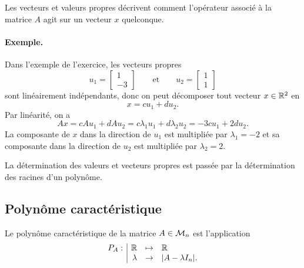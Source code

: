 \remark Les vecteurs et valeurs propres décrivent comment l'opérateur associé à la matrice $A$ agit sur un vecteur $x$ quelconque. 

\paragraph{Exemple.} Dans l'exemple de l'exercice, les vecteurs propres 
$$
u_1 = \left[\begin{array}{r} 1 \\ -3 \end{array}\right]
\qquad \text{et} \qquad 
u_2 = \left[\begin{array}{r} 1 \\ 1 \end{array}\right]
$$
sont linéairement indépendants, donc on peut décomposer tout vecteur $x \in \mathbb{R}^2$ en
$$
x = c u_1 + d u_2.
$$
Par linéarité, on a 
$$
A x = c A u_1 + d A u_2 = c \lambda_1 u_1 + d \lambda_2 u_2 = -3 c u_1 + 2 d u_2.
$$
La composante de $x$ dans la direction de $u_1$ est multipliée par $\lambda_1 = -2$ et sa composante dans la direction de $u_2$ est multipliée par $\lambda_2 = 2$.


\remark La détermination des valeurs et vecteurs propres est passée par la détermination des racines d'un polynôme.

\subsection{Polynôme caractéristique} \label{sec:polCarac}

\begin{definition*}
  Le polynôme caractéristique de la matrice $A \in \mathcal{M}_n$ est l'application 
  $$
  \begin{array}{r|rcl}
   P_A: & \mathbb{R} & \mapsto & \mathbb{R} \\
    & \lambda & \rightarrow & |A - \lambda I_n|.
  \end{array}
  $$
\end{definition*}

